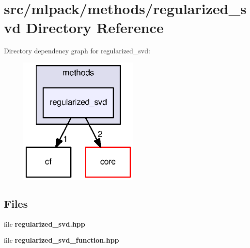 \section{src/mlpack/methods/regularized\+\_\+svd Directory Reference}
\label{dir_e93dcd612dcd8a362b106dc4ba1d7add}
Directory dependency graph for regularized\+\_\+svd\+:
\nopagebreak
\begin{figure}[H]
\begin{center}
\leavevmode
\includegraphics[width=170pt]{dir_e93dcd612dcd8a362b106dc4ba1d7add_dep}
\end{center}
\end{figure}
\subsection*{Files}
\begin{DoxyCompactItemize}
\item 
file {\bf regularized\+\_\+svd.\+hpp}
\item 
file {\bf regularized\+\_\+svd\+\_\+function.\+hpp}
\end{DoxyCompactItemize}
